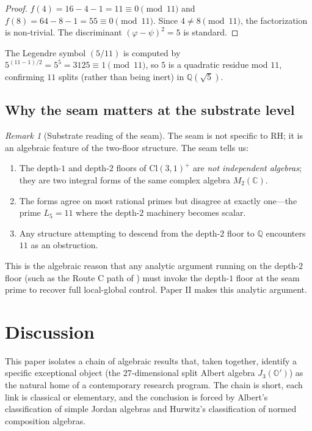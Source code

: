 \documentclass[11pt,a4paper]{article}
\theoremstyle{plain}
\theoremstyle{definition}
\theoremstyle{remark}
\newtheorem{remark}[theorem]{Remark}
\numberwithin{equation}{section}
\providecommand{\Cl}{\mathrm{Cl}}
\providecommand{\C}{\mathbb{C}}
\providecommand{\Q}{\mathbb{Q}}
\providecommand{\Os}{\mathbb{O}'}
\providecommand{\vp}{\varphi}
\providecommand{\ps}{\psi}
\providecommand{\Lk}{L}
\begin{document}
\begin{proof}
$f(4) = 16 - 4 - 1 = 11 \equiv 0 \pmod{11}$ and
$f(8) = 64 - 8 - 1 = 55 \equiv 0 \pmod{11}$.  Since $4 \ne 8 \pmod
{11}$, the factorization is non-trivial.  The discriminant
$(\vp - \ps)^2 = 5$ is standard.
\end{proof}

The Legendre symbol $(5/11)$ is computed by
$5^{(11-1)/2} = 5^5 = 3125 \equiv 1 \pmod{11}$, so $5$ is a
quadratic residue mod $11$, confirming $11$ splits (rather than
being inert) in $\Q(\sqrt 5)$.

\subsection{Why the seam matters at the substrate level}

\begin{remark}[Substrate reading of the seam]
\label{rmk:substrate-seam}
The seam is not specific to RH; it is an algebraic feature of the
two-floor structure.  The seam tells us:
\begin{enumerate}[label=\textnormal{(\arabic*)}]
  \item The depth-$1$ and depth-$2$ floors of $\Cl(3,1)^+$ are
    \emph{not independent algebras}; they are two integral forms
    of the same complex algebra $M_2(\C)$.
  \item The forms agree on most rational primes but disagree at
    exactly one---the prime $\Lk_5 = 11$ where the depth-$2$
    machinery becomes scalar.
  \item Any structure attempting to descend from the depth-$2$
    floor to $\Q$ encounters $11$ as an obstruction.
\end{enumerate}
This is the algebraic reason that any analytic argument running on
the depth-$2$ floor (such as the Route C path of \cite{seam-paper})
must invoke the depth-$1$ floor at the seam prime to recover full
local-global control.  Paper II makes this analytic argument.
\end{remark}

\section{Discussion}
\label{sec:discussion}

This paper isolates a chain of algebraic results that, taken
together, identify a specific exceptional object (the
$27$-dimensional split Albert algebra $J_3(\Os)$) as the natural
home of a contemporary research program.  The chain is short,
each link is classical or elementary, and the conclusion is
forced by Albert's classification of simple Jordan algebras and
Hurwitz's classification of normed composition algebras.
\end{document}
